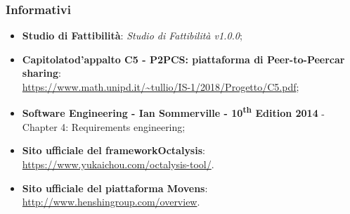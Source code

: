 \subsubsection{Informativi}
\begin{itemize}
	\item \textbf{Studio di Fattibilità}: \textit{Studio di Fattibilità v1.0.0};
	\item \textbf{Capitolato\glosp d'appalto C5 - P2PCS: piattaforma di Peer-to-Peer\glosp car sharing}: \\ \url{ https://www.math.unipd.it/~tullio/IS-1/2018/Progetto/C5.pdf};
	\item \textbf{Software Engineering - Ian Sommerville - 10\textsuperscript{th} Edition 2014}
	\subitem - Chapter 4: Requirements engineering;
	\item \textbf{Sito ufficiale del framework\glosp Octalysis\glo}: \\ \textsf{\url{https://www.yukaichou.com/octalysis-tool/}}. 
	\item \textbf{Sito ufficiale del piattaforma Movens\glo}: \\ \textsf{\url{http://www.henshingroup.com/overview}}. 

\end{itemize}